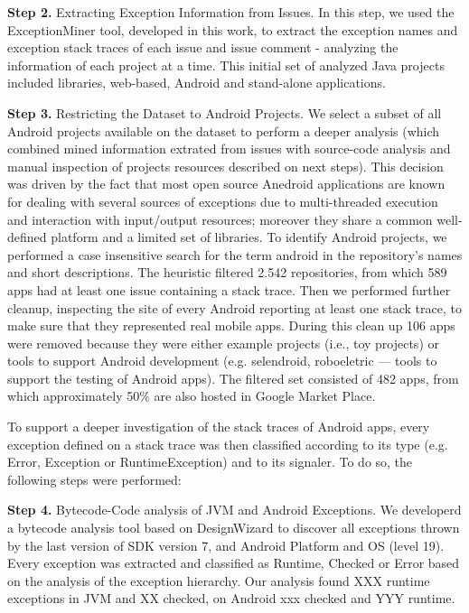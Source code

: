 \documentclass[conference]{IEEEtran}
\begin{document}
\textbf{Step 2.} Extracting Exception Information from Issues. In this step, we used the ExceptionMiner tool,
 developed in this work, to extract the exception names and exception stack traces of each
 issue and issue comment - analyzing the information of each project at a time. This initial 
set of analyzed Java projects included libraries, web-based, Android and stand-alone applications.  

\textbf{Step 3.} Restricting the Dataset to Android Projects. We select a subset of all Android 
projects available on the dataset to perform a deeper analysis (which combined mined
 information extrated from issues with source-code analysis and manual inspection 
of projects resources described on next steps). This decision was driven by the
fact that most open source Anedroid applications are known for dealing
with several sources of exceptions due to multi-threaded execution and
interaction with input/output resources; moreover they share a common
well-defined platform and a limited set of libraries.
To identify Android projects, we performed a case insensitive search for 
the term \textsf{android} in the repository's names and short descriptions.  The
heuristic filtered 2.542 repositories, from which 589 apps had at least one
issue containing a stack trace. Then we performed further cleanup, inspecting the site of every Android
reporting at least one stack trace, to make sure that they represented real
mobile apps. During this clean up 106 apps were removed because they were either
example projects (i.e., toy projects) or tools to support Android development
(e.g. \textsf{selendroid}, \textsf{roboeletric} --- tools to support the testing of Android apps).
The filtered set consisted of 482 apps, from which approximately 50\% are also
hosted in Google Market Place. 

To support a deeper investigation of the stack traces of Android apps, every
exception defined on a stack trace was then classified according to its type
(e.g. Error, Exception or RuntimeException) and to its signaler. To do so, the following 
steps were performed:

\textbf{Step 4.}  Bytecode-Code analysis of JVM and Android Exceptions. We developerd a bytecode analysis tool based on DesignWizard to discover all exceptions thrown by the last version of SDK version 7, and Android Platform and OS (level 19). Every exception was extracted and classified as Runtime, Checked or Error based on the analysis of the exception hierarchy. Our analysis found XXX runtime exceptions in JVM and XX checked, on Android xxx checked and YYY runtime.
\end{document}
